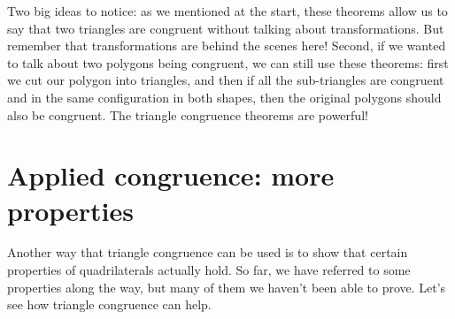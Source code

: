 \documentclass{ximera}
\begin{document}
Two big ideas to notice: as we mentioned at the start, these theorems allow us to say that two triangles are congruent without talking about transformations. But remember that transformations are behind the scenes here! Second, if we wanted to talk about two polygons being congruent, we can still use these theorems: first we cut our polygon into triangles, and then if all the sub-triangles are congruent and in the same configuration in both shapes, then the original polygons should also be congruent. The triangle congruence theorems are powerful!




\section{Applied congruence: more properties}

Another way that triangle congruence can be used is to show that certain properties of quadrilaterals actually hold. So far, we have referred to some properties along the way, but many of them we haven't been able to prove. Let's see how triangle congruence can help.
\end{document}
